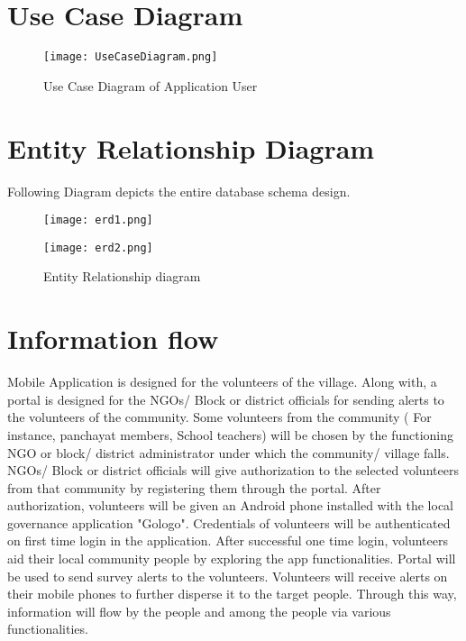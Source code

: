 \section{Use Case Diagram}
\begin{figure}[H]
    \centering
	\texttt{[image: UseCaseDiagram.png]}
    \caption{Use Case Diagram of Application User}
    \label{fig:Use Case Diagram of Application User}
\end{figure}

\pagebreak
\section{Entity Relationship Diagram}

Following Diagram depicts the entire database schema design.
\begin{figure}[H]
    \centering
	\texttt{[image: erd1.png]}
    \label{fig:erd1}
\end{figure}
\begin{figure}[H]
    \centering
	\texttt{[image: erd2.png]}
    \caption{Entity Relationship diagram}
    \label{fig:erd2}
\end{figure}
\section{Information flow}
Mobile Application is designed for the volunteers of the village. Along with, a portal is designed for the  NGOs/ Block or district officials for sending alerts to the volunteers of the community. Some volunteers from the community ( For instance, panchayat members, School teachers) will be chosen by the functioning NGO or block/ district administrator under which the community/ village falls. NGOs/ Block or district officials will give authorization to the selected volunteers from that community by registering them through the portal. After authorization, volunteers will be given an Android phone installed with the local governance application "Gologo". Credentials of volunteers will be authenticated on first time login in the application. After successful one time login, volunteers aid their local community people by exploring the app functionalities. Portal will be used to send survey alerts to the volunteers. Volunteers will receive alerts  on their mobile phones to further disperse it to the target people. Through this way, information will flow by the people and  among the people via various functionalities.


%